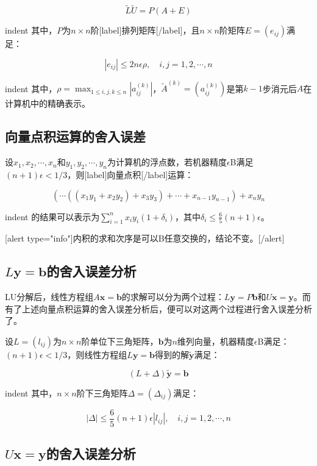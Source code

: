 \documentclass[UTF8,nofonts]{ctexart}
\begin{document}
\[\tilde{L}\tilde{U}=P(A+E)\]

indent 其中，$P$为$n \times n$阶[label]排列矩阵[/label]，且$n \times n$阶矩阵$E=(e_{ij})$满足：

\begin{equation}
\label{eq:rho}
|e_{ij}| \leq 2n\epsilon\rho,\quad i,j=1,2,\cdots,n
\end{equation}

indent 其中，$\rho=\max_{1 \leq i,j,k \leq n}|a^{(k)}_{ij}|$，$\tilde{A}^{(k)}=\left(a_{ij}^{(k)}\right)$是第$k-1$步消元后$A$在计算机中的精确表示。

\subsection*{向量点积运算的舍入误差}

设$x_1,x_2,\cdots,x_n$和$y_1,y_2,\cdots,y_n$为计算机的浮点数，若机器精度$\epsilon$B满足$(n+1)\epsilon<1/3$，则[label]向量点积[/label]运算：

\[
\left(\cdots\left(\left(x_1y_1+x_2y_2\right)+x_3y_3\right)+\cdots+x_{n-1}y_{n-1}\right)+x_ny_n
\]

indent 的结果可以表示为$\sum_{i=1}^nx_iy_i(1+\delta_i)$，其中$\delta_i \leq \frac{6}{5}(n+1)\epsilon$。

[alert type="info"]内积的求和次序是可以B任意交换的，结论不变。[/alert]


\subsection*{$L\boldsymbol{y}=\boldsymbol{b}$的舍入误差分析}

LU分解后，线性方程组$A\boldsymbol{x}=\boldsymbol{b}$的求解可以分为两个过程：$L\boldsymbol{y}=P\boldsymbol{b}$和$U\boldsymbol{x}=\boldsymbol{y}$。而有了上述向量点积运算的舍入误差分析后，便可以对这两个过程进行舍入误差分析了。

设$L=(l_{ij})$为$n \times n$阶单位下三角矩阵，$\boldsymbol{b}$为$n$维列向量，机器精度$\epsilon$B满足：$(n+1)\epsilon<1/3$，则线性方程组$L\boldsymbol{y}=\boldsymbol{b}$得到的解$\tilde{\boldsymbol{y}}$满足：

\[(L+\Delta)\tilde{\boldsymbol{y}}=\boldsymbol{b}\]

indent 其中，$n \times n$阶下三角矩阵$\Delta=(\Delta_{ij})$满足：

\[|\Delta| \leq \dfrac{6}{5}(n+1)\epsilon|l_{ij}|,\quad i,j=1,2,\cdots,n\]

\subsection*{$U\boldsymbol{x}=\boldsymbol{y}$的舍入误差分析}
\end{document}
